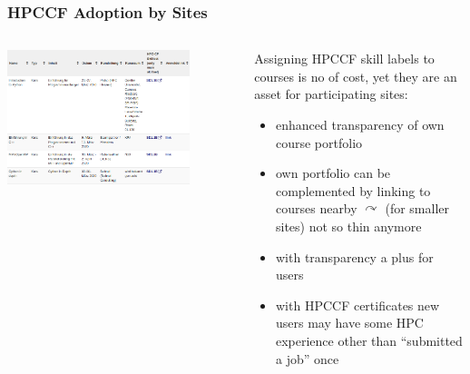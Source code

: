 \begin{frame}
  \frametitle{HPCCF Adoption by Sites}
  \begin{columns}
   \begin{column}{0.5\textwidth}
    \centering
    \includegraphics[width=0.8\textwidth]{images/linking_skills}\\
   \end{column}
   \begin{column}{0.5\textwidth}
     Assigning HPCCF skill labels to courses is no of cost, yet they are an asset for participating sites:
     \begin{itemize}
      \item enhanced transparency of own course portfolio
      \item own portfolio can be complemented by linking to courses nearby $\curvearrowright$ (for smaller sites) not so thin anymore
      \item with transparency a plus for users
      \item with HPCCF certificates new users may have some HPC experience other than ``submitted a job'' once
     \end{itemize}
   \end{column}
  \end{columns}
\end{frame}


